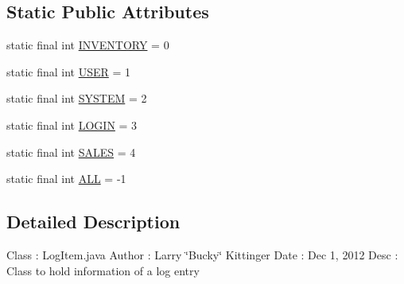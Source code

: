 \subsection*{Static Public Attributes}
\begin{DoxyCompactItemize}
\item 
static final int \hyperlink{classw3se_1_1_model_1_1_base_1_1_log_item_a7141965c98c3ed33290ed768d4d58f4c}{I\-N\-V\-E\-N\-T\-O\-R\-Y} = 0
\item 
static final int \hyperlink{classw3se_1_1_model_1_1_base_1_1_log_item_a0c7fc0675948fe7a6c775947e3a787b7}{U\-S\-E\-R} = 1
\item 
static final int \hyperlink{classw3se_1_1_model_1_1_base_1_1_log_item_aabdb055d1856ee1696926765c491280e}{S\-Y\-S\-T\-E\-M} = 2
\item 
static final int \hyperlink{classw3se_1_1_model_1_1_base_1_1_log_item_ada91e98d7b1752f49a56677e685b133d}{L\-O\-G\-I\-N} = 3
\item 
static final int \hyperlink{classw3se_1_1_model_1_1_base_1_1_log_item_a5c236a773e159a0a005c086bae64919e}{S\-A\-L\-E\-S} = 4
\item 
static final int \hyperlink{classw3se_1_1_model_1_1_base_1_1_log_item_a3d096f4b0f6b7c06440a21d96b38b354}{A\-L\-L} = -\/1
\end{DoxyCompactItemize}


\subsection{Detailed Description}
Class \-: Log\-Item.\-java Author \-: Larry \char`\"{}\-Bucky\char`\"{} Kittinger Date \-: Dec 1, 2012 Desc \-: Class to hold information of a log entry 

